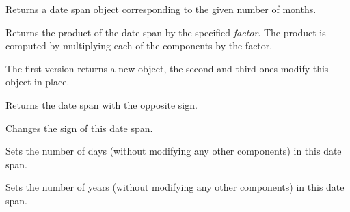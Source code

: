 Returns a date span object corresponding to the given number of months.



\label{wxdatespanmultiply}




Returns the product of the date span by the specified {\it factor}. The
product is computed by multiplying each of the components by the factor.

The first version returns a new object, the second and third ones modify this
object in place.

\label{wxdatespannegate}


Returns the date span with the opposite sign.



\label{wxdatespanneg}



Changes the sign of this date span.



\label{wxdatespansetdays}


Sets the number of days (without modifying any other components) in this date
span.

\label{wxdatespansetyears}


Sets the number of years (without modifying any other components) in this date
span.

\label{wxdatespansetmonths}

